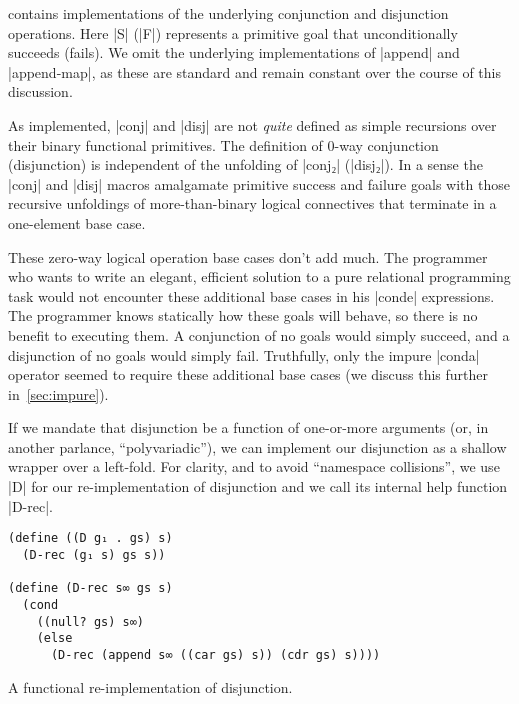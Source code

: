 \documentclass[sigplan,screen,draft,anonymous,review,natbib=false]{acmart}
\begin{document}
 contains implementations of
the underlying conjunction and disjunction operations. Here
\rackinline|S| (\rackinline|F|) represents a primitive goal that
unconditionally succeeds (fails). We omit the underlying
implementations of \rackinline|append| and \rackinline|append-map|, as
these are standard and remain constant over the course of this
discussion.

As implemented, \rackinline|conj| and \rackinline|disj| are not
\emph{quite} defined as simple recursions over their binary functional
primitives. The definition of 0-way conjunction (disjunction) is
independent of the unfolding of \rackinline|conj₂|
(\rackinline|disj₂|). In a sense the \rackinline|conj| and
\rackinline|disj| macros amalgamate primitive success and failure
goals with those recursive unfoldings of more-than-binary logical
connectives that terminate in a one-element base case.

These zero-way logical operation base cases don't add much. The
programmer who wants to write an elegant, efficient solution to a pure
relational programming task would not encounter these additional base
cases in his \rackinline|conde| expressions. The programmer knows
statically how these goals will behave, so there is no benefit to
executing them. A conjunction of no goals would simply succeed, and a
disjunction of no goals would simply fail. Truthfully, only the impure
\rackinline|conda| operator seemed to require these additional base
cases (we discuss this further in~\cref{sec:impure}).

If we mandate that disjunction be a function of one-or-more arguments
(or, in another parlance, \enquote{polyvariadic}), we can implement
our disjunction as a shallow wrapper over a left-fold. For clarity,
and to avoid \enquote{namespace collisions}, we use \rackinline|D| for
our re-implementation of disjunction and we call its internal help
function \rackinline|D-rec|.

\begin{listing}
  \begin{verbatim}
(define ((D g₁ . gs) s)
  (D-rec (g₁ s) gs s))

(define (D-rec s∞ gs s)
  (cond
    ((null? gs) s∞)
    (else
      (D-rec (append s∞ ((car gs) s)) (cdr gs) s))))
  \end{verbatim}
  \caption{A functional re-implementation of disjunction.}
  \label{mnt:disj-re-implementation}
\end{listing}
\end{document}
